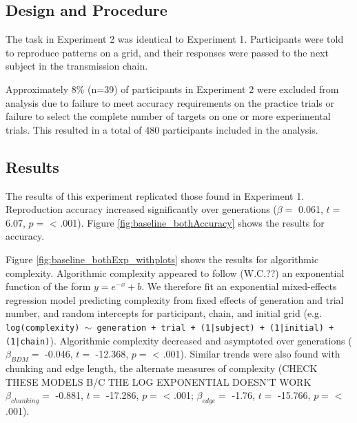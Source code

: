 \documentclass[10pt, letterpaper]{article}
\begin{document}
\subsection{Design and Procedure}\label{design-and-procedure-1}

The task in Experiment 2 was identical to Experiment 1. Participants
were told to reproduce patterns on a grid, and their responses were
passed to the next subject in the transmission chain.

Approximately 8\% (n=39) of participants in Experiment 2 were excluded
from analysis due to failure to meet accuracy requirements on the
practice trials or failure to select the complete number of targets on
one or more experimental trials. This resulted in a total of 480
participants included in the analysis.

\subsection{Results}\label{results-1}

The results of this experiment replicated those found in Experiment 1.
Reproduction accuracy increased significantly over generations
(\(\beta =\) 0.061, \(t =\) 6.07, \(p =\) \textless{} .001). Figure
\ref{fig:baseline_bothAccuracy} shows the results for accuracy.

Figure \ref{fig:baseline_bothExp_withplots} shows the results for
algorithmic complexity. Algorithmic complexity appeared to follow
(W.C.??) an exponential function of the form \(y = e^{-x} + b\). We
therefore fit an exponential mixed-effects regression model predicting
complexity from fixed effects of generation and trial number, and random
intercepts for participant, chain, and initial grid (e.g.
\texttt{log(complexity) $\sim$ generation + trial + (1|subject) + (1|initial) + (1|chain)}).
Algorithmic complexity decreased and asymptoted over generations
(\(\beta_{BDM} =\) -0.046, \(t =\) -12.368, \(p =\) \textless{} .001).
Similar trends were also found with chunking and edge length, the
alternate measures of complexity (CHECK THESE MODELS B/C THE LOG
EXPONENTIAL DOESN'T WORK \(\beta_{chunking} =\) -0.881, \(t =\) -17.286,
\(p =\) \textless{} .001; \(\beta_{edge} =\) -1.76, \(t =\) -15.766,
\(p =\) \textless{} .001).
\end{document}
